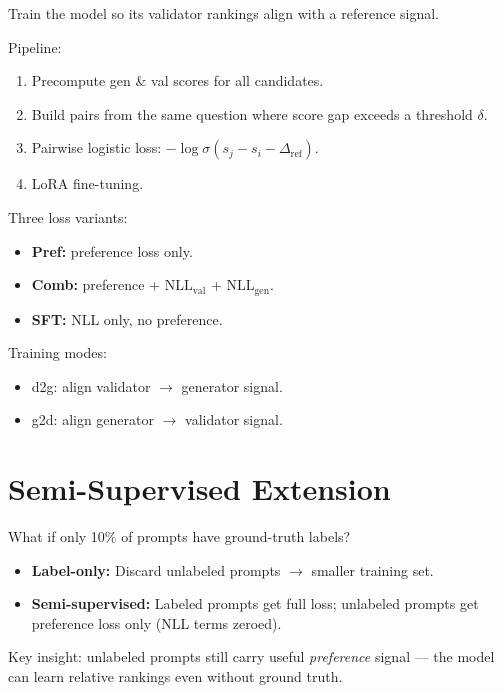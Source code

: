 \documentclass[11pt]{article}
\begin{document}
Train the model so its validator rankings align with a reference signal.

Pipeline:
\begin{enumerate}
  \item Precompute gen \& val scores for all candidates.
  \item Build pairs from the same question where score gap exceeds a threshold $\delta$.
  \item Pairwise logistic loss: $-\log \sigma(s_j - s_i - \Delta_{\text{ref}})$.
  \item LoRA fine-tuning.
\end{enumerate}

Three loss variants:
\begin{itemize}
  \item \textbf{Pref:} preference loss only.
  \item \textbf{Comb:} preference + NLL$_{\text{val}}$ + NLL$_{\text{gen}}$.
  \item \textbf{SFT:} NLL only, no preference.
\end{itemize}

Training modes:
\begin{itemize}
  \item d2g: align validator $\to$ generator signal.
  \item g2d: align generator $\to$ validator signal.
\end{itemize}



\section{Semi-Supervised Extension}

What if only 10\% of prompts have ground-truth labels?

\begin{itemize}
  \item \textbf{Label-only:} Discard unlabeled prompts $\to$ smaller training set.
  \item \textbf{Semi-supervised:} Labeled prompts get full loss; unlabeled prompts get preference loss only (NLL terms zeroed).
\end{itemize}

Key insight: unlabeled prompts still carry useful \emph{preference} signal --- the model can learn relative rankings even without ground truth.
\end{document}
